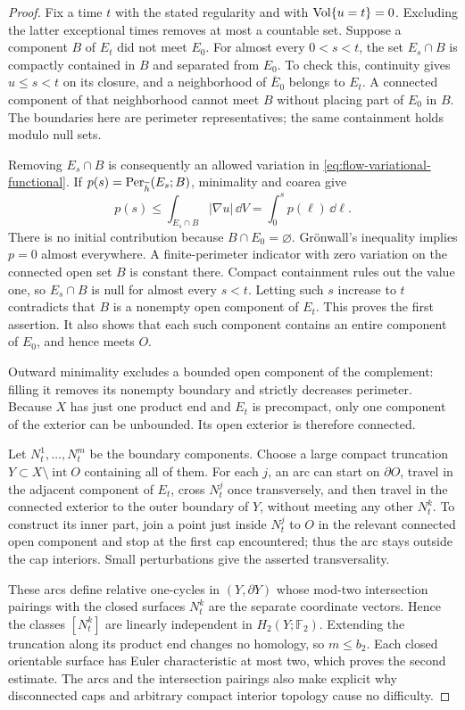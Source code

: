 \begin{proof}
Fix a time $t$ with the stated regularity and with
$\operatorname{Vol}\{u=t\}=0$.  Excluding the latter exceptional times removes at
most a countable set.  Suppose a component $B$ of $E_t$ did not meet
$E_0$.  For almost every $0<s<t$, the set $E_s\cap B$ is compactly
contained in $B$ and separated from $E_0$.  To check this, continuity
gives $u\le s<t$ on its closure, and a neighborhood of
$\overline E_0$ belongs to $E_t$.  A connected component of that
neighborhood cannot meet $B$ without placing part of $E_0$ in $B$.
The boundaries here are perimeter representatives; the same
containment holds modulo null sets.

Removing $E_s\cap B$ is consequently an allowed variation in
\eqref{eq:flow-variational-functional}.  If
$p(s)=\operatorname{Per}_{\widetilde h}(E_s;B)$, minimality and coarea give
\begin{equation}\label{eq:flow-no-new-components}
 p(s)\le\int_{E_s\cap B}|\nabla u|\,\dd V
       =\int_0^s p(\ell)\,\dd\ell.
\end{equation}
There is no initial contribution because $B\cap E_0=\varnothing$.
Gr\"onwall's inequality implies $p=0$ almost everywhere.  A
finite-perimeter indicator with zero variation on the connected open
set $B$ is constant there.  Compact containment rules out the value
one, so $E_s\cap B$ is null for almost every $s<t$.  Letting such $s$
increase to $t$ contradicts that $B$ is a nonempty open component of
$E_t$.  This proves the first assertion.  It also shows that each such
component contains an entire component of $E_0$, and hence meets $O$.

Outward minimality excludes a bounded open component of the
complement: filling it removes its nonempty boundary and strictly
decreases perimeter.  Because $X$ has just one product end and $E_t$
is precompact, only one component of the exterior can be unbounded.
Its open exterior is therefore connected.

Let $N_t^1,\ldots,N_t^m$ be the boundary components.  Choose a large
compact truncation
$Y\subset X\setminus\operatorname{int}O$ containing all of them.
For each $j$, an arc can start on $\partial O$, travel in the adjacent
component of $E_t$, cross $N_t^j$ once transversely, and then travel in
the connected exterior to the outer boundary of $Y$, without meeting
any other $N_t^k$.  To construct its inner part, join a point just
inside $N_t^j$ to $O$ in the relevant connected open component and
stop at the first cap encountered; thus the arc stays outside the cap
interiors.  Small perturbations give the asserted transversality.

These arcs define relative one-cycles in $(Y,\partial Y)$ whose
mod-two intersection pairings with the closed surfaces $N_t^k$ are
the separate coordinate vectors.  Hence the classes $[N_t^k]$ are
linearly independent in $H_2(Y;\mathbb F_2)$.  Extending the
truncation along its product end changes no homology, so $m\le b_2$.
Each closed orientable surface has Euler characteristic at most two,
which proves the second estimate.  The arcs and the intersection
pairings also make explicit why disconnected caps and arbitrary
compact interior topology cause no difficulty.
\end{proof}

